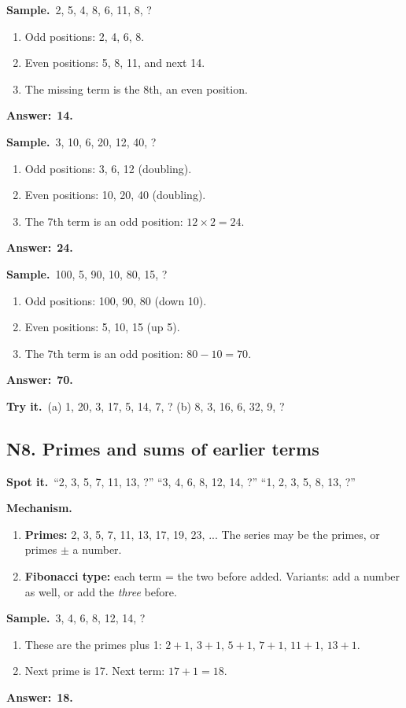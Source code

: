 \documentclass[11pt,a4paper]{article}
\let\oldsubsection\subsection
\renewcommand{\subsection}{\needspace{9\baselineskip}\oldsubsection}
\newcommand{\spot}{\textbf{\color{ember}Spot it.}\ }
\newcommand{\mech}{\textbf{\color{ember}Mechanism.}\ }
\newif\ifkeepsamp
\newcommand{\ans}[1]{\par\nopagebreak\noindent\textbf{\color{ember}Answer:}\ \textbf{#1}\par}
\newcommand{\samp}{\ifkeepsamp\needspace{4\baselineskip}\fi\textbf{\color{ember}Sample.}\ }
\newcommand{\tryit}[1]{\textbf{\color{ember}Try it.}\ #1}
\begin{document}
\samp 2, 5, 4, 8, 6, 11, 8, ?
\begin{enumerate}
\item Odd positions: 2, 4, 6, 8.
\item Even positions: 5, 8, 11, and next 14.
\item The missing term is the 8th, an even position.
\end{enumerate}
\ans{14.}

\samp 3, 10, 6, 20, 12, 40, ?
\begin{enumerate}
\item Odd positions: 3, 6, 12 (doubling).
\item Even positions: 10, 20, 40 (doubling).
\item The 7th term is an odd position: $12 \times 2 = 24$.
\end{enumerate}
\ans{24.}

\samp 100, 5, 90, 10, 80, 15, ?
\begin{enumerate}
\item Odd positions: 100, 90, 80 (down 10).
\item Even positions: 5, 10, 15 (up 5).
\item The 7th term is an odd position: $80 - 10 = 70$.
\end{enumerate}
\ans{70.}

\tryit (a) 1, 20, 3, 17, 5, 14, 7, ? (b) 8, 3, 16, 6, 32, 9, ?

\subsection{N8. Primes and sums of earlier terms}
\spot ``2, 3, 5, 7, 11, 13, ?'' ``3, 4, 6, 8, 12, 14, ?'' ``1, 2, 3, 5, 8, 13, ?''

\mech
\begin{enumerate}
\item \textbf{Primes:} 2, 3, 5, 7, 11, 13, 17, 19, 23, ... The series may be the primes, or primes $\pm$ a number.
\item \textbf{Fibonacci type:} each term = the two before added. Variants: add a number as well, or add the \emph{three} before.
\end{enumerate}

\samp 3, 4, 6, 8, 12, 14, ?
\begin{enumerate}
\item These are the primes plus 1: $2 + 1$, $3 + 1$, $5 + 1$, $7 + 1$, $11 + 1$, $13 + 1$.
\item Next prime is 17. Next term: $17 + 1 = 18$.
\end{enumerate}
\ans{18.}
\end{document}
